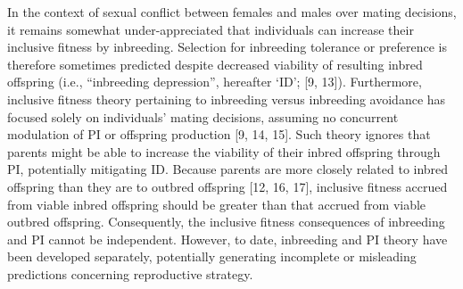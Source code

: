 \documentclass[12pt]{article}
\begin{document}
In the context of sexual conflict between females and males over mating decisions, it remains somewhat under-appreciated that individuals can increase their inclusive fitness by inbreeding. Selection for inbreeding tolerance or preference is therefore sometimes predicted despite decreased viability of resulting inbred offspring (i.e., ``inbreeding depression'', hereafter `ID'; [9, 13]). Furthermore, inclusive fitness theory pertaining to inbreeding versus inbreeding avoidance has focused solely on individuals' mating decisions, assuming no concurrent modulation of PI or offspring production [9, 14, 15]. Such theory ignores that parents might be able to increase the viability of their inbred offspring through PI, potentially mitigating ID. Because parents are more closely related to inbred offspring than they are to outbred offspring [12, 16, 17], inclusive fitness accrued from viable inbred offspring should be greater than that accrued from viable outbred offspring. Consequently, the inclusive fitness consequences of inbreeding and PI cannot be independent. However, to date, inbreeding and PI theory have been developed separately, potentially generating incomplete or misleading predictions concerning reproductive strategy.
\end{document}
